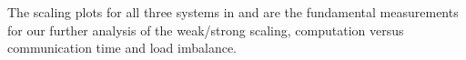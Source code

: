 \documentclass{sig-alternate}
\begin{document}
The scaling plots for all three
systems in  and  are the fundamental
measurements for our further analysis of the weak/strong scaling, computation
versus communication time and load imbalance.
\begin{figure}
  \centering
\end{figure}
\end{document}
